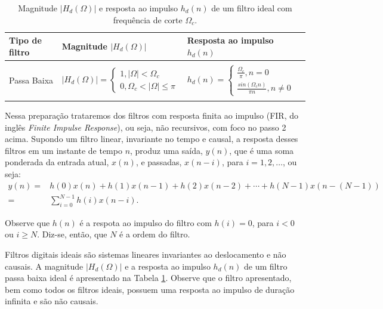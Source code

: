 \documentclass[12pt,addpoints]{exam}
\begin{document}
\begin{table}[b]
\begin{center}
\begin{tabular}{lll}  \\ \hline
Tipo de filtro & Magnitude $\left|H_d(\Omega)\right|$ & Resposta ao impulso $h_d(n)$  \\ \hline
&  & \\
Passa Baixa &  $|H_d(\Omega)|= \begin{cases}
1,  \left|\Omega\right| < \Omega_c \\
0 , \Omega_c < \left|\Omega\right| \leq \pi 
\end{cases}$
& 
$h_d(n)=\begin{cases}
\frac{\Omega_c}{\pi}, n=0 \\
\frac{sin\left(\Omega_c n\right)}{\pi n} , n\neq0 
\end{cases}$ \\
& & \\
\end{tabular}
\end{center}
\caption{Magnitude $|H_d(\Omega)|$ e resposta ao impulso $h_d(n)$ de um filtro ideal com frequência de corte $\Omega_c$.}
\label{filtroIdeal}
\end{table}

Nessa preparação trataremos dos filtros com resposta finita ao impulso (FIR, do inglês \textit{Finite Impulse Response}), ou seja, não recursivos, com foco no passo 2 acima. Supondo um filtro linear, invariante no tempo e causal, a resposta desses filtros em um instante de tempo $n$,  produz uma saída, $y(n)$, que é uma soma ponderada da entrada atual, $x(n)$, e passadas, $x(n-i)$, para $i = 1, 2, \ldots$, ou seja:
\begin{align} 
    y(n) =& h(0)x(n) + h(1)x(n- 1) + h(2)x(n - 2) + \cdots + h(N-1)x(n - (N-1)) \nonumber \\
    =& \sum_{i = 0}^{N-1} h(i)x(n - i). \label{eq:sfiltro}
\end{align}

Observe que $h(n)$ é a respota ao impulso do filtro com $h(i) = 0$, para $i < 0$ ou $i \ge N$. Diz-se, então, que $N$ é a ordem do filtro. 
		
Filtros digitais ideais são sistemas lineares invariantes ao deslocamento e não causais. A magnitude $|H_d(\Omega)|$ e a resposta ao impulso $h_d(n)$ de um filtro passa baixa ideal é apresentado na Tabela \ref{filtroIdeal}. Observe que o filtro apresentado, bem como todos os filtros ideais, possuem uma resposta ao impulso de duração infinita e são não causais.  
\end{document}
